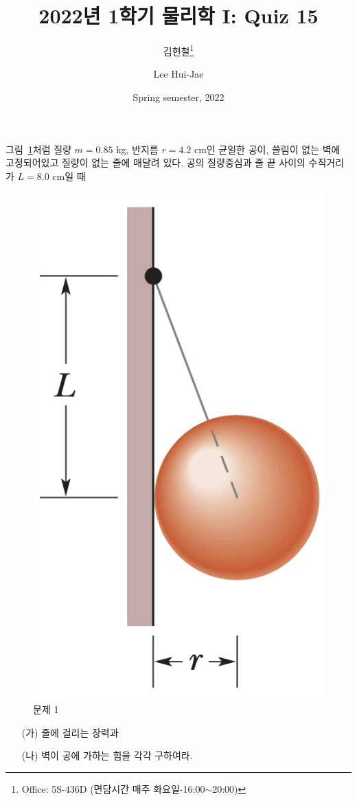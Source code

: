 \documentclass[floatfix,nofootinbib,superscriptaddress,fleqn]{revtex4-2}
\begin{document}
\title{\Large 2022년 1학기 물리학 I: Quiz 15}
\author{김현철\footnote{Office: 5S-436D (면담시간 매주
    화요일-16:00$\sim$20:00)}} 
\author{Lee Hui-Jae} 
\date{Spring semester, 2022}


\vspace{1.cm}

\maketitle


그림~\ref{fig:1}처럼 질량 $m=0.85$ kg, 반지름 $r=4.2$ cm인 균일한 공이,
쓸림이 없는 벽에 고정되어있고 질량이 없는 줄에 매달려 있다. 공의
질량중심과 줄 끝 사이의 수직거리가 $L=8.0$ cm일 때
\begin{figure}[htp]
  \centering
\includegraphics[scale=0.5]{Qfig15-1-20220502.png}
  \caption{문제 1}
  \label{fig:1}
\end{figure}
\begin{itemize}
\item[(가)] 줄에 걸리는 장력과
\item[(나)] 벽이 공에 가하는 힘을 각각 구하여라. 
\end{itemize}
\end{document}
